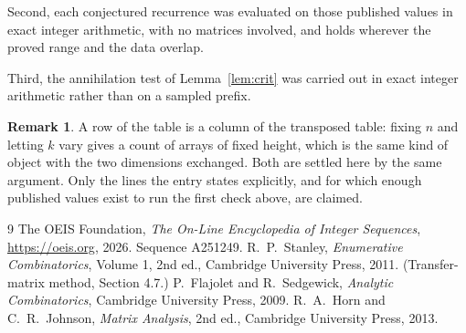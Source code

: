 \documentclass[11pt,a4paper]{article}
\theoremstyle{plain}
\theoremstyle{definition}
\newtheorem{remark}[theorem]{Remark}
\begin{document}
Second, each conjectured recurrence was evaluated on those published values in exact
integer arithmetic, with no matrices involved, and holds wherever the proved range and the
data overlap.

Third, the annihilation test of Lemma~\ref{lem:crit} was carried out in exact integer
arithmetic rather than on a sampled prefix.

\begin{remark}
A row of the table is a column of the transposed table: fixing $n$ and letting $k$ vary gives a
count of arrays of fixed height, which is the same kind of object with the two dimensions
exchanged. Both are settled here by the same argument. Only the lines the entry states
explicitly, and for which enough published values exist to run the first check above, are
claimed.
\end{remark}

\begin{thebibliography}{9}
 The OEIS Foundation, \emph{The On-Line Encyclopedia of Integer
Sequences}, \url{https://oeis.org}, 2026. Sequence A251249.
 R.~P.~Stanley, \emph{Enumerative Combinatorics}, Volume 1, 2nd ed.,
Cambridge University Press, 2011. (Transfer-matrix method, Section 4.7.)
 P.~Flajolet and R.~Sedgewick, \emph{Analytic Combinatorics}, Cambridge
University Press, 2009.
 R.~A.~Horn and C.~R.~Johnson, \emph{Matrix Analysis}, 2nd ed., Cambridge
University Press, 2013.
\end{thebibliography}
\end{document}
